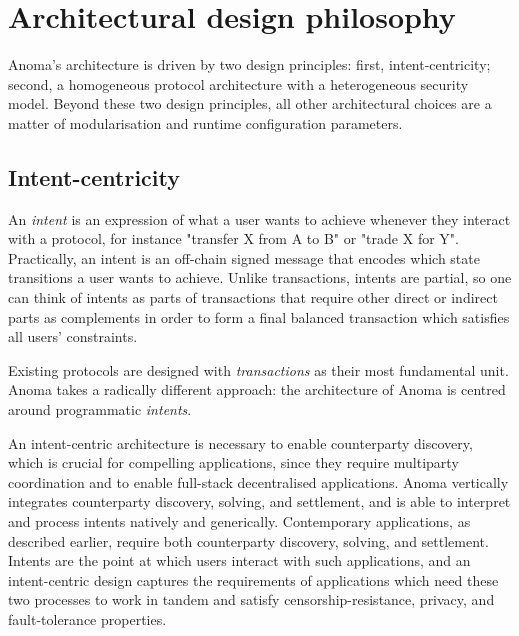 \documentclass[
    9pt,            %
    commun,        %
    affiltop,       %
]{art}
\begin{document}
\section{Architectural design philosophy}\label{architectural-design-philosophy}

Anoma's architecture is driven by two design principles:
first, intent-centricity; second, a homogeneous protocol architecture
with a heterogeneous security model. Beyond these two design principles,
all other architectural choices are a matter of modularisation and
runtime configuration parameters.

\subsection{Intent-centricity}\label{intent-centricity}

An \emph{intent} is an expression of what a user wants to achieve
whenever they interact with a protocol, for instance "transfer X from A
to B" or "trade X for Y". Practically, an intent is an off-chain signed
message that encodes which state transitions a user wants to achieve.
Unlike transactions, intents are partial, so one can think of intents as
parts of transactions that require other direct or indirect parts as
complements in order to form a final balanced transaction which
satisfies all users' constraints.

Existing protocols are designed with \emph{transactions} as their most
fundamental unit. Anoma takes a radically different approach: the
architecture of Anoma is centred around programmatic \emph{intents}.

An intent-centric architecture is necessary to enable counterparty
discovery, which is crucial for compelling applications, since they
require multiparty coordination and to enable full-stack decentralised
applications. Anoma vertically integrates counterparty discovery,
solving, and settlement, and is able to interpret and process intents
natively and generically. Contemporary applications, as described
earlier, require both counterparty discovery, solving, and settlement.
Intents are the point at which users interact with such applications,
and an intent-centric design captures the requirements of applications
which need these two processes to work in tandem and satisfy
censorship-resistance, privacy, and fault-tolerance properties.
\end{document}
